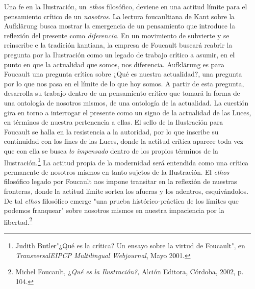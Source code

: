 \documentclass{book}
\begin{document}
Una fe en la Ilustración, un \emph{ethos} filosófico, deviene en una
actitud límite para el pensamiento crítico de un \emph{nosotros}. La
lectura foucaultiana de Kant sobre la Aufklärung busca mostrar la
emergencia de un pensamiento que introduce la reflexión del presente
como \emph{diferencia}. En un movimiento de subvierte y se reinscribe e
la tradición kantiana, la empresa de Foucault buscará reabrir la
pregunta por la Ilustración como un legado de trabajo crítico a asumir,
en el punto en que la actualidad que somos, nos diferencia. Aufklärung
es para Foucault una pregunta crítica sobre ¿Qué es nuestra actualidad?,
una pregunta por lo que nos pasa en el límite de lo que hoy somos. A
partir de esta pregunta, desarrolla su trabajo dentro de un pensamiento
crítico que tomará la forma de una ontología de nosotros mismos, de una
ontología de la actualidad. La cuestión gira en torno a interrogar el
presente como un signo de la actualidad de las Luces, en términos de
nuestra pertenencia a ellas. El sello de la Ilustración para Foucault se
halla en la resistencia a la autoridad, por lo que inscribe su
continuidad con los fines de las Luces, donde la actitud crítica aparece
toda vez que con ella se busca \emph{lo impensado} dentro de los propios
términos de la Ilustración.\footnote{Judith Butler"¿Qué es la crítica?
  Un ensayo sobre la virtud de Foucault", en \emph{TransversalEIPCP
  Multilingual Webjournal}, Mayo 2001.} La actitud propia de la
modernidad será entendida como una crítica permanente de nosotros mismos
en tanto sujetos de la Ilustración. El \emph{ethos} filosófico legado
por Foucault nos impone transitar en la reflexión de nuestras fronteras,
donde la actitud límite sortea los afueras y los adentros,
esquivándolos. De tal \emph{ethos} filosófico emerge "una prueba
histórico-práctica de los límites que podemos franquear" sobre nosotros
mismos en nuestra impaciencia por la libertad.\footnote{Michel Foucault,
  ¿\emph{Qué es la Ilustración?,} Alción Editora, Córdoba, 2002, p. 104.}
\end{document}
